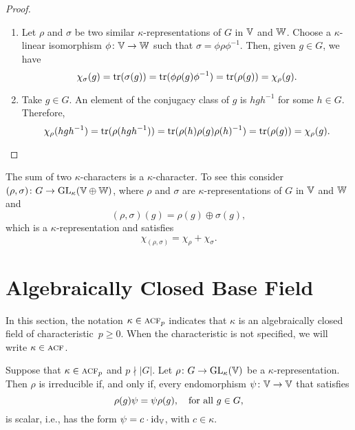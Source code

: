 \begin{proof}${}$
    \begin{enumerate}[\rm a)]
        \item Let $\rho$ and $\sigma$ be two similar $\kappa$-representations of $G$ in $\mathbb V$ and $\mathbb W$. Choose a $\kappa$-linear isomorphism $\phi\colon\mathbb V\to\mathbb W$ such that $\sigma=\phi\rho\phi^{-1}$. Then, given $g\in G$, we have
        $$
            \chi_\sigma(g)=\operatorname{tr}(\sigma(g))=\operatorname{tr}(\phi\rho(g)\phi^{-1})
                =\operatorname{tr}(\rho(g))=\chi_\rho(g).
        $$

        \item Take $g\in G$. An element of the conjugacy class of $g$ is $hgh^{-1}$ for some $h\in G$. Therefore,
        $$
            \chi_\rho(hgh^{-1})=\operatorname{tr}(\rho(hgh^{-1}))
                = \operatorname{tr}(\rho(h)\rho(g)\rho(h)^{-1})
                = \operatorname{tr}(\rho(g)) = \chi_\rho(g).
        $$
    \end{enumerate}
\end{proof}

\begin{rem}\label{rem:sum-of-characters}
    The sum of two $\kappa$-characters is a $\kappa$-character. To see this consider $(\rho,\sigma)\colon G\to{\rm GL}_\kappa(\mathbb V\oplus\mathbb W)$, where $\rho$ and $\sigma$ are $\kappa$-representations of $G$ in $\mathbb V$ and $\mathbb W$ and
    $$
        (\rho,\sigma)(g) = \rho(g)\oplus\sigma(g),
    $$
    which is a $\kappa$-representation and satisfies
    $$
        \chi_{(\rho,\sigma)}=\chi_\rho+\chi_\sigma.
    $$
\end{rem}

\section{Algebraically Closed Base Field}

\newcommand{\acf}{\op{\textnormal{\textsc{acf}}}}
\begin{ntn}
    In this section, the notation\/ $\kappa\in\acf_p$ indicates that\/ $\kappa$ is an algebraically closed field of characteristic\/~$p\ge0$. When the characteristic is not specified, we will write\/ $\kappa\in\acf$.
\end{ntn}

\begin{prop}
    Suppose that $\kappa\in\acf_p$ and $p\nmid|G|$. Let\/ $\rho\colon G\to{\rm GL}_\kappa(\mathbb V)$ be a $\kappa$-representation. Then\/ $\rho$ is irreducible if, and only if, every endomorphism $\psi\colon\mathbb V\to\mathbb V$ that satisfies 
    \begin{equation}\label{eq:rho-commutativity}
        \rho(g)\psi = \psi\rho(g), \quad
            \text{\rm for all } g \in G,
    \end{equation}
    is scalar, i.e., has the form\/ $\psi=c\cdot\operatorname{id}_\mathbb V$, with\/ $c\in \kappa$.
\end{prop}

